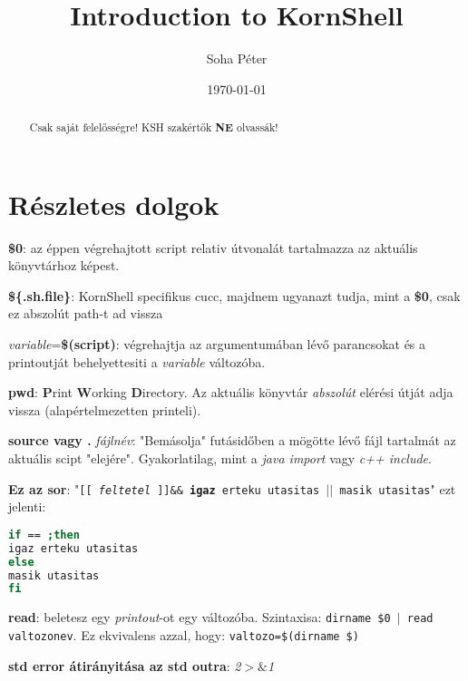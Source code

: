 \documentclass{article}
\begin{document}
\title{Introduction to KornShell}
\author{Soha Péter}
\date{\today}

\maketitle

\begin{abstract}
Csak saját felelősségre! KSH szakértők \textbf{NE} olvassák!
\end{abstract}

\section{Részletes dolgok}
\textbf{\$0}: az éppen végrehajtott script relativ útvonalát tartalmazza az aktuális könyvtárhoz képest.\newline

\textbf{\$\{.sh.file\}}: KornShell specifikus cucc,  majdnem ugyanazt tudja, mint a \textbf{\$0}, csak ez abszolút path-t ad vissza\newline

\textit{variable}=\textbf{\$(script)}: végrehajtja az argumentumában lévő parancsokat és a printoutját behelyettesiti a \textit{variable} változóba.\newline

\textbf{pwd}: \textbf{P}rint \textbf{W}orking \textbf{D}irectory. Az aktuális könyvtár \textit{abszolút} elérési útját adja vissza (alapértelmezetten printeli).\newline

\textbf{source vagy .} \textit{fájlnév}: "Bemásolja" futásidőben a mögötte lévő fájl tartalmát az aktuális scipt "elejére". Gyakorlatilag, mint a \textit{java import} vagy \textit{c++ include}.\newline 

\textbf{Ez az sor}: 
"\texttt{[[ \textit{feltetel} ]]\&\& \textbf{igaz} erteku utasitas $||$ masik utasitas}" ezt jelenti: 
\begin{lstlisting}[language=bash]
if == ;then
igaz erteku utasitas 
else
masik utasitas
fi
\end{lstlisting}

\textbf{read}: beletesz egy \textit{printout}-ot egy változóba. Szintaxisa: \texttt{dirname \$0 $|$ read valtozonev}. Ez ekvivalens azzal, hogy: \texttt{valtozo=\$(dirname \$)}\newline

\textbf{std error átirányitása az std outra}: \textit{2$>\&$1}
\end{document}
